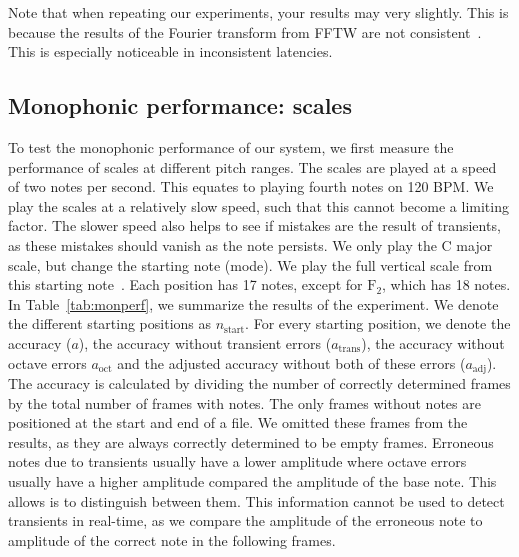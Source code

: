 \documentclass[10pt,twocolumn]{article}
\begin{document}
Note that when repeating our experiments, your results may very slightly. This is because the results of the Fourier transform from FFTW are not consistent~\cite{fftw}. This is especially noticeable in inconsistent latencies.

\subsection{Monophonic performance: scales}
To test the monophonic performance of our system, we first measure the performance of scales at different pitch ranges. The scales are played at a speed of two notes per second. This equates to playing fourth notes on 120 BPM. We play the scales at a relatively slow speed, such that this cannot become a limiting factor. The slower speed also helps to see if mistakes are the result of transients, as these mistakes should vanish as the note persists. We only play the C major scale, but change the starting note (mode). We play the full vertical scale from this starting note~\cite{scale}. Each position has 17 notes, except for $\text{F}_2$, which has 18 notes. In Table~\ref{tab:monperf}, we summarize the results of the experiment. We denote the different starting positions as $n_\text{start}$. For every starting position, we denote the accuracy ($a$), the accuracy without transient errors ($a_\text{trans}$), the accuracy without octave errors $a_\text{oct}$ and the adjusted accuracy without both of these errors ($a_\text{adj}$). The accuracy is calculated by dividing the number of correctly determined frames by the total number of frames with notes. The only frames without notes are positioned at the start and end of a file. We omitted these frames from the results, as they are always correctly determined to be empty frames. Erroneous notes due to transients usually have a lower amplitude where octave errors usually have a higher amplitude compared the amplitude of the base note. This allows is to distinguish between them. This information cannot be used to detect transients in real-time, as we compare the amplitude of the erroneous note to amplitude of the correct note in the following frames.
\end{document}
